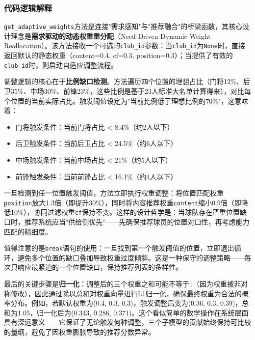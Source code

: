 \documentclass[a4paper]{article}
\begin{document}
\subsubsection{代码逻辑解释}

\texttt{get\_adaptive\_weights}方法是连接"需求感知"与"推荐融合"的桥梁函数，其核心设计理念是\textbf{需求驱动的动态权重重分配}（Need-Driven Dynamic Weight Reallocation）。该方法接收一个可选的\texttt{club\_id}参数：当\texttt{club\_id}为\texttt{None}时，直接返回默认的静态权重（content=0.4, cf=0.3, position=0.3）；当提供了有效的\texttt{club\_id}时，则启动自适应调整流程。

调整逻辑的核心在于\textbf{比例缺口检测}。方法遍历四个位置的理想占比（门将12\%、后卫35\%、中场30\%、前锋23\%，这些比例是基于23人标准大名单计算得来），对比每个位置的当前实际占比。触发阈值设定为"当前比例低于理想比例的70\%"，这意味着：
\begin{itemize}
    \item 门将触发条件：当前门将占比 < 8.4\%（约2人以下）
    \item 后卫触发条件：当前后卫占比 < 24.5\%（约6人以下）
    \item 中场触发条件：当前中场占比 < 21\%（约5人以下）
    \item 前锋触发条件：当前前锋占比 < 16.1\%（约4人以下）
\end{itemize}

一旦检测到任一位置触发阈值，方法立即执行权重调整：将位置匹配权重\texttt{position}放大1.3倍（即提升30\%），同时将内容推荐权重\texttt{content}缩小0.9倍（即降低10\%），协同过滤权重\texttt{cf}保持不变。这样的设计哲学是：当球队存在严重位置缺口时，推荐系统应当"供给侧优先"——先确保推荐球员的位置对口性，再考虑能力匹配的精细度。

值得注意的是\texttt{break}语句的使用：一旦找到第一个触发阈值的位置，立即退出循环，避免多个位置的缺口叠加导致权重过度倾斜。这是一种保守的调整策略——每次只响应最紧迫的一个位置缺口，保持推荐列表的多样性。

最后的关键步骤是\textbf{归一化}：调整后的三个权重之和可能不等于1（因为权重被非对称修改），因此通过除以总和对权重向量进行L1归一化，确保最终权重为合法的概率分布。例如，若默认权重为(0.4, 0.3, 0.3)，触发调整后变为(0.36, 0.3, 0.39)，总和为1.05，归一化后为(0.343, 0.286, 0.371)。这个看似简单的数学操作在系统层面具有深远意义——它保证了无论触发何种调整，三个子模型的贡献始终保持可比较的量纲，避免了因权重膨胀导致的推荐分数异常。


\end{document}
